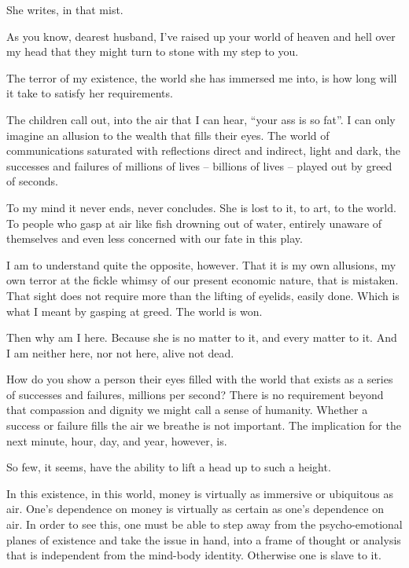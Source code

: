 She writes, in that mist.

As you know, dearest husband, I've raised up your world of heaven and
hell over my head that they might turn to stone with my step to you.

The terror of my existence, the world she has immersed me into, is how
long will it take to satisfy her requirements.

The children call out, into the air that I can hear, ``your ass is so
fat''.  I can only imagine an allusion to the wealth that fills their
eyes.  The world of communications saturated with reflections direct
and indirect, light and dark, the successes and failures of millions
of lives -- billions of lives -- played out by greed of seconds.

To my mind it never ends, never concludes.  She is lost to it, to art,
to the world.  To people who gasp at air like fish drowning out of
water, entirely unaware of themselves and even less concerned with our
fate in this play.

I am to understand quite the opposite, however.  That it is my own
allusions, my own terror at the fickle whimsy of our present economic
nature, that is mistaken.  That sight does not require more than the
lifting of eyelids, easily done.  Which is what I meant by gasping at
greed.  The world is won.

Then why am I here.  Because she is no matter to it, and every matter
to it.  And I am neither here, nor not here, alive not dead.

How do you show a person their eyes filled with the world that exists
as a series of successes and failures, millions per second?  There is
no requirement beyond that compassion and dignity we might call a
sense of humanity.  Whether a success or failure fills the air we
breathe is not important.  The implication for the next minute, hour,
day, and year, however, is.

So few, it seems, have the ability to lift a head up to such a height.

\vfill
\break

In this existence, in this world, money is virtually as immersive or
ubiquitous as air.  One's dependence on money is virtually as certain
as one's dependence on air.  In order to see this, one must be able to
step away from the psycho-emotional planes of existence and take the
issue in hand, into a frame of thought or analysis that is independent
from the mind-body identity.  Otherwise one is slave to it.


